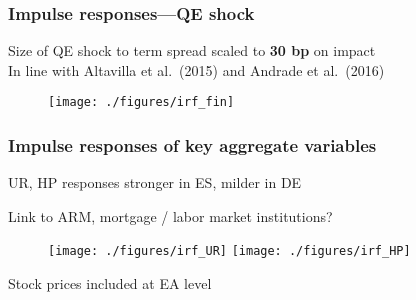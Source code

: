 \documentclass[pdflatex,aspectratio=169]{beamer}
\newcommand{\jbemph}[1]{\textbf{\color{SlideNavy}#1}}
\begin{document}
\begin{frame}\frametitle{\bf Impulse responses---QE shock}
\bi
\item Size of QE shock to term spread scaled to \jbemph{30 bp} on impact\\
In line with Altavilla et al.\ (2015) and Andrade et al.\ (2016)
\ei
\begin{figure}
\begin{center}
\texttt{[image: ./figures/irf\_fin]} %
\end{center}
\end{figure}

\end{frame}



\begin{frame}\frametitle{\bf Impulse responses of key aggregate variables}
\bi
\item UR, HP responses stronger in ES, milder in DE
\item Link to ARM, mortgage / labor market institutions?
\ei
\begin{figure}
\begin{center}
\texttt{[image: ./figures/irf\_UR]}
\texttt{[image: ./figures/irf\_HP]}
\end{center}
\end{figure}
\bi
\item Stock prices included at EA level
\ei
\end{frame}


\end{document}
